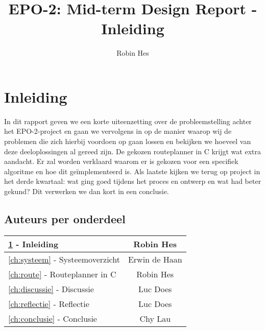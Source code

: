 \documentclass{report}
\title{EPO-2: Mid-term Design Report - Inleiding}
\author{Robin Hes}
\begin{document}
\chapter{Inleiding}
\label{ch:inleiding}

In dit rapport geven we een korte uiteenzetting over de probleemstelling achter het EPO-2-project en gaan we vervolgens in op de manier waarop wij de problemen die zich hierbij voordoen op gaan lossen en bekijken we hoeveel van deze deeloplossingen al gereed zijn. De gekozen routeplanner in C krijgt wat extra aandacht. Er zal worden verklaard waarom er is gekozen voor een specifiek algoritme en hoe dit geïmplementeerd is. Als laatste kijken we terug op project in het derde kwartaal: wat ging goed tijdens het proces en ontwerp en wat had beter gekund? Dit verwerken we dan kort in een conclusie. 

\section{Auteurs per onderdeel}

\begin{tabular}[l]{| l | c |}
	\hline
	\ref{ch:inleiding} - Inleiding & Robin Hes \\
	\hline
	\ref{ch:systeem} - Systeemoverzicht & Erwin de Haan\\
	\hline
	\ref{ch:route} - Routeplanner in C & Robin Hes \\
	\hline
	\ref{ch:discussie} - Discussie & Luc Does\\
	\hline
	\ref{ch:reflectie} - Reflectie & Luc Does \\
	\hline
	\ref{ch:conclusie} - Conclusie & Chy Lau\\
	\hline	
\end{tabular}
\end{document}
